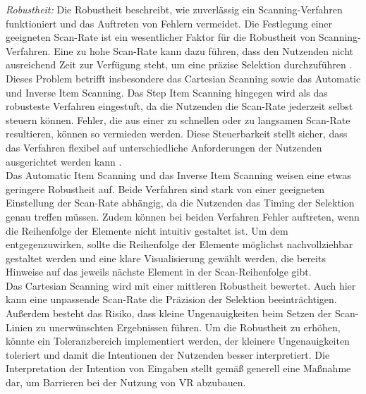 \textit{Robustheit:}
Die Robustheit beschreibt, wie zuverlässig ein Scanning-Verfahren funktioniert und das Auftreten von Fehlern vermeidet. Die Festlegung einer geeigneten Scan-Rate ist ein wesentlicher Faktor für die Robustheit von Scanning-Verfahren. Eine zu hohe Scan-Rate kann dazu führen, dass den Nutzenden nicht ausreichend Zeit zur Verfügung steht, um eine präzise Selektion durchzuführen \citep{COOK2015117}. Dieses Problem betrifft insbesondere das Cartesian Scanning sowie das Automatic und Inverse Item Scanning. Das Step Item Scanning hingegen wird als das robusteste Verfahren eingestuft, da die Nutzenden die Scan-Rate jederzeit selbst steuern können. Fehler, die aus einer zu schnellen oder zu langsamen Scan-Rate resultieren, können so vermieden werden. Diese Steuerbarkeit stellt sicher, dass das Verfahren flexibel auf unterschiedliche Anforderungen der Nutzenden ausgerichtet werden kann \citep{COOK2015117}.\\
Das Automatic Item Scanning und das Inverse Item Scanning weisen eine etwas geringere Robustheit auf. Beide Verfahren sind stark von einer geeigneten Einstellung der Scan-Rate abhängig, da die Nutzenden das Timing der Selektion genau treffen müssen. Zudem können bei beiden Verfahren Fehler auftreten, wenn die Reihenfolge der Elemente nicht intuitiv gestaltet ist. Um dem entgegenzuwirken, sollte die Reihenfolge der Elemente möglichst nachvollziehbar gestaltet werden und eine klare Visualisierung gewählt werden, die bereits Hinweise auf das jeweils nächste Element in der Scan-Reihenfolge gibt.\\
Das Cartesian Scanning wird mit einer mittleren Robustheit bewertet. Auch hier kann eine unpassende Scan-Rate die Präzision der Selektion beeinträchtigen. Außerdem besteht das Risiko, dass kleine Ungenauigkeiten beim Setzen der Scan-Linien zu unerwünschten Ergebnissen führen. Um die Robustheit zu erhöhen, könnte ein Toleranzbereich implementiert werden, der kleinere Ungenauigkeiten toleriert und damit die Intentionen der Nutzenden besser interpretiert. Die Interpretation der Intention von Eingaben stellt gemäß \citet{10.1007/978-3-030-21607-8_3} generell eine Maßnahme dar, um Barrieren bei der Nutzung von VR abzubauen. 


